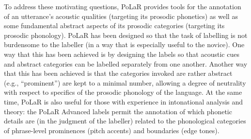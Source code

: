 

To address these motivating questions, PoLaR provides tools for the annotation of an utterance’s acoustic qualities (targeting its prosodic phonetics) as well as some fundamental abstract aspects of its prosodic categories (targeting its prosodic phonology). PoLaR has been designed so that the task of labelling is not burdensome to the labeller (in a way that is especially useful to the novice). One way that this has been achieved is by designing the labels so that acoustic cues and abstract categories can be labelled separately from one another. Another way that this has been achieved is that the categories invoked are rather abstract (e.g., “prominent”) are kept to a minimal number, allowing a degree of neutrality with respect to specifics of the prosodic phonology of the language. At the same time, PoLaR is also useful for those with experience in intonational analysis and theory: the PoLaR Advanced labels permit the annotation of which phonetic details are (in the judgment of the labeller) related to the phonological categories of phrase-level prominences (pitch accents) and boundaries (edge tones).

